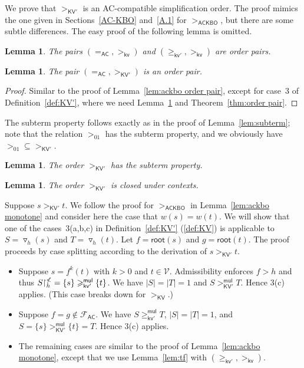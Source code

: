 \documentclass{tlp}
\newcommand{\qed}{\hspace*{1em}\hbox{\proofbox}}
\newtheorem{lemma}[theorem]{Lemma}
\newcommand{\tf}[1]{{\triangledown_{\!#1}}}
\newcommand{\m}[1]{\mathsf{#1}}
\newcommand{\mc}[1]{\mathcal{#1}}
\newcommand{\mr}[1]{\mathrm{#1}}
\newcommand{\rt}{\m{root}}
\newcommand{\Wt}{\m{w,root}}
\renewcommand{\Wt}{\m{kv}}
\newcommand{\kvc}{{\m{kv'}}}
\newcommand{\mul}{\m{mul}}
\newcommand{\FF}{\mc{F}}
\newcommand{\VV}{\mc{V}}
\newcommand{\AC}{\mr{\m{AC}}}
\newcommand{\ackbo}{\mr{\m{ACKBO}}}
\newcommand{\KV}{\mr{\m{KV}}}
\newcommand{\KVC}{\mr{\m{KV'}}}
\newcommand{\rrs}[3][f]{{#2}{\restriction}^{\smash{#3}}_{#1}}
\begin{document}
We prove that $>_\KVC$ is an AC-compatible
simplification order. The proof mimics the one given in
Sections~\ref{AC-KBO} and~\ref{A.1} for $>_\ackbo$,
but there are some subtle differences.
The easy proof of the following lemma is omitted.

\begin{lemma}
\label{lem:Wt order pair}
The pairs $({=_\AC},{>_\Wt})$ and $({\geqslant_\kvc},{>_\Wt})$ are order
pairs.
\qed
\end{lemma}

\begin{lemma}
The pair $({=_\AC},{>_\KVC})$ is an order pair.
\end{lemma}
\begin{proof}
Similar to the proof of Lemma~\ref{lem:ackbo order pair}, except for
case~3 of Definition~\ref{def:KV'}, where we need
Lemma~\ref{lem:Wt order pair} and
Theorem~\ref{thm:order pair}.
\end{proof}

The subterm property follows exactly as in the proof of
Lemma~\ref{lem:subterm}; note that
the relation $>_{01}$ has the subterm property, and
we obviously have ${>_{01}} \subseteq {>_\KVC}$.

\begin{lemma}
\label{lem:kvd-sub}
The order $>_\KVC$ has the subterm property.
\qed
\end{lemma}

\begin{lemma}
\label{lem:kvd-mono}
The order $>_\KVC$ is closed under contexts.
\end{lemma}
\begin{proof*}
Suppose $s >_\KVC t$. We follow the proof for $>_\ackbo$ in Lemma~\ref{lem:ackbo monotone} and consider here the case that
$w(s) = w(t)$. We will show that one of the cases~3(a,b,c) in
Definition~\ref{def:KV'} (\ref{def:KV}) is
applicable to $S = \tf{h}(s)$ and $T = \tf{h}(t)$.
Let $f = \rt(s)$ and $g = \rt(t)$.
The proof proceeds by case splitting according to the  derivation of
$s >_\KVC t$.
\begin{itemize}
\item
Suppose $s = f^k(t)$ with $k > 0$ and $t \in \VV$.
Admissibility enforces $f > h$ and thus
$\rrs[h]{S}{\nless} = \{ s \} \geqslant_\kvc^\mul \{ t \}$.
We have $|S| = |T| = 1$ and $S >_\KVC^\mul T$.
Hence 3(c) applies. (This case breaks down for $>_\KV$.)
\smallskip
\item
Suppose $f = g \notin \FF_\AC$.
We have $S \geqslant_\kvc^\mul T$, $|S| = |T| = 1$, and
$S = \{ s \} >_\KVC^\mul \{ t \} = T$.
Hence 3(c) applies.
\smallskip
\item
The remaining cases are similar to the proof of
Lemma~\ref{lem:ackbo monotone}, except that we use Lemma~\ref{lem:tf}
with $({\geqslant_\kvc},{>_\Wt})$.
\qed
\end{itemize}
\end{proof*}
\end{document}
